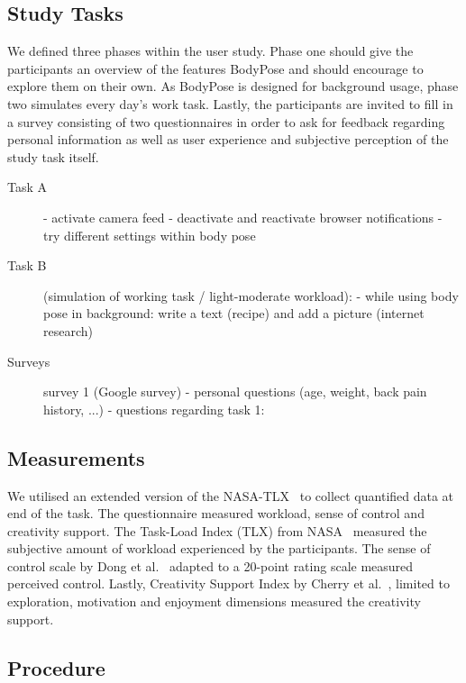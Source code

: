 \subsection{Study Tasks} %
\label{us1-tasks}
We defined three phases within the user study. Phase one should give the participants an overview of the features BodyPose and should encourage to explore them on their own. As BodyPose is designed for background usage, phase two simulates every day's work task. Lastly, the participants are invited to fill in a survey consisting of two questionnaires in order to ask for feedback regarding personal information as well as user experience and subjective perception of the study task itself.
\begin{description}

\item[Task A]
    - activate camera feed
    - deactivate and reactivate browser notifications
    - try different settings within body pose

\item[Task B] (simulation of working task / light-moderate workload):
    - while using body pose in background: write a text (recipe) and add a picture (internet research)

\item[Surveys]
    survey 1 (Google survey)
        - personal questions (age, weight, back pain history, ...)
        - questions regarding task 1: 

\end{description}

\subsection{Measurements} %
\label{us1-measurements}

We utilised an extended version of the NASA-TLX~\cite{hart2006nasa} to collect quantified data at end of the task. The questionnaire measured workload, sense of control and creativity support. The Task-Load Index (TLX) from NASA~\cite{hart2006nasa} measured the subjective amount of workload experienced by the participants. The sense of control scale by Dong et al.~\cite{dong2015development} adapted to a 20-point rating scale measured perceived control. Lastly, Creativity Support Index by Cherry et al.~\cite{cherry2014quantifying}, limited to exploration, motivation and enjoyment dimensions measured the creativity support.

\subsection{Procedure} %
\label{us1-procedure}
